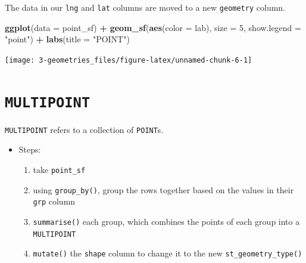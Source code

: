 \documentclass[
]{report}
\newenvironment{Shaded}{\begin{snugshade}}{\end{snugshade}}
\newcommand{\DataTypeTok}[1]{\textcolor[rgb]{0.13,0.29,0.53}{#1}}
\newcommand{\DecValTok}[1]{\textcolor[rgb]{0.00,0.00,0.81}{#1}}
\newcommand{\KeywordTok}[1]{\textcolor[rgb]{0.13,0.29,0.53}{\textbf{#1}}}
\newcommand{\NormalTok}[1]{#1}
\newcommand{\OperatorTok}[1]{\textcolor[rgb]{0.81,0.36,0.00}{\textbf{#1}}}
\newcommand{\StringTok}[1]{\textcolor[rgb]{0.31,0.60,0.02}{#1}}
\providecommand{\tightlist}{%
  \setlength{\itemsep}{0pt}\setlength{\parskip}{0pt}}
\begin{document}
The data in our \texttt{lng} and \texttt{lat} columns are moved to a new \texttt{geometry} column.

\begin{Shaded}
\begin{Highlighting}[]
\KeywordTok{ggplot}\NormalTok{(}\DataTypeTok{data =}\NormalTok{ point\_sf) }\OperatorTok{+}\StringTok{ }
\StringTok{  }\KeywordTok{geom\_sf}\NormalTok{(}\KeywordTok{aes}\NormalTok{(}\DataTypeTok{color =}\NormalTok{ lab), }\DataTypeTok{size =} \DecValTok{5}\NormalTok{, }\DataTypeTok{show.legend =} \StringTok{"point"}\NormalTok{) }\OperatorTok{+}
\StringTok{  }\KeywordTok{labs}\NormalTok{(}\DataTypeTok{title =} \StringTok{"POINT"}\NormalTok{)}
\end{Highlighting}
\end{Shaded}

\begin{center}\texttt{[image: 3-geometries\_files/figure-latex/unnamed-chunk-6-1]} \end{center}

\hypertarget{multipoint}{%
\section{\texorpdfstring{\texttt{MULTIPOINT}}{MULTIPOINT}}\label{multipoint}}

\texttt{MULTIPOINT} refers to a collection of \texttt{POINT}s.

\begin{itemize}
\tightlist
\item
  Steps:

  \begin{enumerate}
  \def\labelenumi{\arabic{enumi}.}
  \tightlist
  \item
    take \texttt{point\_sf}
  \item
    using \texttt{group\_by()}, group the rows together based on the values in their \texttt{grp} column
  \item
    \texttt{summarise()} each group, which combines the points of each group into a \texttt{MULTIPOINT}
  \item
    \texttt{mutate()} the \texttt{shape} column to change it to the new \texttt{st\_geometry\_type()}
  \end{enumerate}
\end{itemize}
\end{document}
